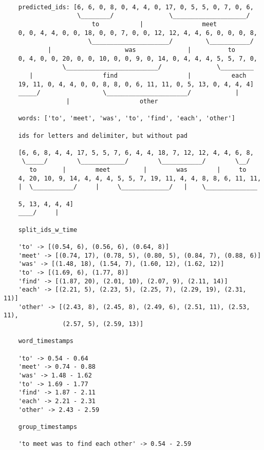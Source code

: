 \begin{verbatim}
    
    predicted_ids: [6, 6, 0, 8, 0, 4, 4, 0, 17, 0, 5, 5, 0, 7, 0, 6,
                    \________/               \____________________/
                        to           |                meet
    0, 0, 4, 4, 0, 0, 18, 0, 0, 7, 0, 0, 12, 12, 4, 4, 6, 0, 0, 0, 8,
                       \_____________________/         \___________/
            |                    was              |          to           
    0, 4, 0, 0, 20, 0, 0, 10, 0, 0, 9, 0, 14, 0, 4, 4, 4, 5, 5, 7, 0,
                \_________________________/               \_________    
       |                   find                   |           each        
    19, 11, 0, 4, 4, 0, 0, 8, 8, 0, 6, 11, 11, 0, 5, 13, 0, 4, 4, 4]
    _____/                 \______________________/            |
                 |                   other

    words: ['to', 'meet', 'was', 'to', 'find', 'each', 'other']

    ids for letters and delimiter, but without pad

    [6, 6, 8, 4, 4, 17, 5, 5, 7, 6, 4, 4, 18, 7, 12, 12, 4, 4, 6, 8,
     \_____/        \____________/        \___________/        \__/
       to       |        meet         |        was        |     to
    4, 20, 10, 9, 14, 4, 4, 4, 5, 5, 7, 19, 11, 4, 4, 8, 8, 6, 11, 11,
    |  \___________/     |     \_____________/   |    \______________

    5, 13, 4, 4, 4]
    ____/     |

    split_ids_w_time

    'to' -> [(0.54, 6), (0.56, 6), (0.64, 8)]
    'meet' -> [(0.74, 17), (0.78, 5), (0.80, 5), (0.84, 7), (0.88, 6)]
    'was' -> [(1.48, 18), (1.54, 7), (1.60, 12), (1.62, 12)]
    'to' -> [(1.69, 6), (1.77, 8)]
    'find' -> [(1.87, 20), (2.01, 10), (2.07, 9), (2.11, 14)]
    'each' -> [(2.21, 5), (2.23, 5), (2.25, 7), (2.29, 19), (2.31, 11)]
    'other' -> [(2.43, 8), (2.45, 8), (2.49, 6), (2.51, 11), (2.53, 11),
                (2.57, 5), (2.59, 13)]

    word_timestamps

    'to' -> 0.54 - 0.64
    'meet' -> 0.74 - 0.88
    'was' -> 1.48 - 1.62
    'to' -> 1.69 - 1.77
    'find' -> 1.87 - 2.11
    'each' -> 2.21 - 2.31
    'other' -> 2.43 - 2.59

    group_timestamps

    'to meet was to find each other' -> 0.54 - 2.59
\end{verbatim}


